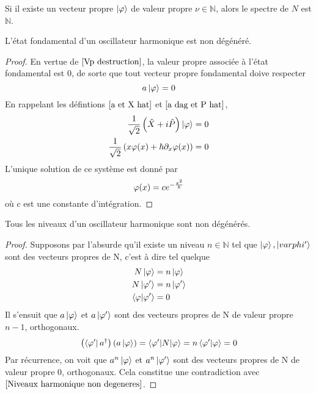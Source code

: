 \documentclass[../Notesdecours.tex]{subfiles}
\begin{document}
\begin{corollary}
    Si il existe un vecteur propre $\ket{\varphi}$ de valeur propre $\nu\in\mathbb{N}$, alors le spectre de $N$ est $\mathbb{N}$.
\end{corollary}

\begin{Property}
    \label{Niveaux harmonique non degeneres}
    L'état fondamental d'un oscillateur harmonique est non dégénéré.
\end{Property}

\begin{proof}
    En vertue de $\ref{Vp destruction}$, la valeur propre associée à l'état fondamental est 0, de sorte que tout vecteur propre fondamental doive respecter 
    \begin{equation}
        a\ket{\varphi} = 0
    \end{equation}
    En rappelant les défintions $\eqref{a et X hat}$ et $\eqref{a dag et P hat}$, 
    \begin{align*}
        \frac{1}{\sqrt{2}}\left(\hat{X}+i\hat{P}\right)\ket{\varphi} &= 0\\
        \frac{1}{\sqrt{2}}\left(x\varphi(x)+\hbar\partial_x \varphi(x)\right) &= 0
    \end{align*}
    L'unique solution de ce système est donné par 
    \begin{equation}
        \varphi(x) = ce^{-\frac{x^2}{\hbar}}
    \end{equation}
    où c est une constante d'intégration.
\end{proof}

\begin{Property}
    Tous les niveaux d'un oscillateur harmonique sont non dégénérés.
\end{Property}
\begin{proof}
    Supposons par l'absurde qu'il existe un niveau $n\in\mathbb{N}$ tel que $\ket{\varphi},\ket{varphi'}$ sont des vecteurs propres de N, c'est à dire tel quelque 
    \begin{align}
        N\ket{\varphi} &= n\ket{\varphi}\\
        N\ket{\varphi'} &= n\ket{\varphi'}\\
        \braket{\varphi|\varphi'} &= 0
    \end{align}
    Il s'ensuit que $a\ket{\varphi}$ et $a\ket{\varphi'}$ sont des vecteurs propres de N de valeur propre $n-1$, orthogonaux.
    \begin{equation*}
        \left(\bra{\varphi'}a^\dagger\right)\left(a\ket{\varphi}\right) = \braket{\varphi'|N|\varphi} = n\braket{\varphi'|\varphi} = 0
    \end{equation*}
    Par récurrence, on voit que $a^n\ket{\varphi}$ et $a^n\ket{\varphi'}$ sont des vecteurs propres de N de valeur propre 0, orthogonaux. Cela constitue une contradiction avec $\ref{Niveaux harmonique non degeneres}$.
\end{proof}
\end{document}
